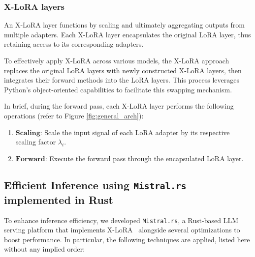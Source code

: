 \subsubsection{X-LoRA layers} An X-LoRA layer functions by scaling and ultimately aggregating outputs from multiple adapters. Each X-LoRA layer encapsulates the original LoRA layer, thus retaining access to its corresponding adapters.

To effectively apply X-LoRA across various models, the X-LoRA approach replaces the original LoRA layers with newly constructed X-LoRA layers, then integrates their forward methods into the LoRA layers. This process leverages Python’s object-oriented capabilities to facilitate this swapping mechanism.

In brief, during the forward pass, each X-LoRA layer performs the following operations (refer to Figure \ref{fig:general_arch}):

\begin{enumerate}
    \item $\mathbf{Scaling}$: Scale the input signal of each LoRA adapter by its respective scaling factor $\lambda_i$.
    \item $\mathbf{Forward}$: Execute the forward pass through the encapsulated LoRA layer.
\end{enumerate}

\subsection{Efficient Inference using \texttt{Mistral.rs} implemented in Rust} To enhance inference efficiency, we developed \texttt{Mistral.rs}, a Rust-based LLM serving platform that implements X-LoRA~\cite{matsakis2014rust} alongside several optimizations to boost performance. In particular, the following techniques are applied, listed here without any implied order:

